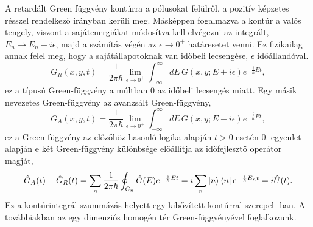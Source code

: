 A retardált Green függvény kontúrra a pólusokat felülről, a pozitív képzetes résszel rendelkező irányban kerüli meg. Másképpen fogalmazva a kontúr a valós tengely, viszont a sajátenergiákat módosítva kell elvégezni az integrált, $E_n\to E_n-i\epsilon$, majd a számítás végén az $\epsilon\to 0^+$ határesetet venni. Ez fizikailag annak felel meg, hogy a sajátállapotoknak van időbeli lecsengése, $\epsilon$ időállandóval.
\begin{equation}
	G_R(x,y,t)=\frac{1}{2\pi\hbar}\lim_{\epsilon\to 0^+}\int_{-\infty}^{\infty}dE\,G(x,y;E+i\epsilon)e^{-\frac{i}{\hbar}Et},
\end{equation}
ez a típusú Green-függvény a múltban $0$ az időbeli lecsengés miatt. Egy másik nevezetes Green-függvény az avanzsált Green-függvény,
\begin{equation}
	G_A(x,y,t)=\frac{1}{2\pi\hbar}\lim_{\epsilon\to 0^+}\int_{-\infty}^{\infty}dE\,G(x,y;E-i\epsilon)e^{-\frac{i}{\hbar}Et},
\end{equation}
ez a Green-függvény az előzőhöz hasonló logika alapján $t>0$ esetén $0$.  egyenlet alapján e két Green-függvény különbsége előállítja az időfejlesztő operátor magját,
\begin{equation}
	\hat{G}_A(t)-\hat{G}_R(t)=\sum_n\frac{1}{2\pi\hbar}\oint_{C_n}\hat{G}(E)e^{-\frac{i}{\hbar}Et}=i\sum_n\Ket{n}\Bra{n}e^{-\frac{i}{\hbar}E_nt}=i\hat{U}(t).
\end{equation}
Ez a kontúrintegrál szummázás helyett egy kibővített kontúrral szerepel \cite{pertergreen}-ban. A továbbiakban az egy dimenziós homogén tér Green-függvényével foglalkozunk.







